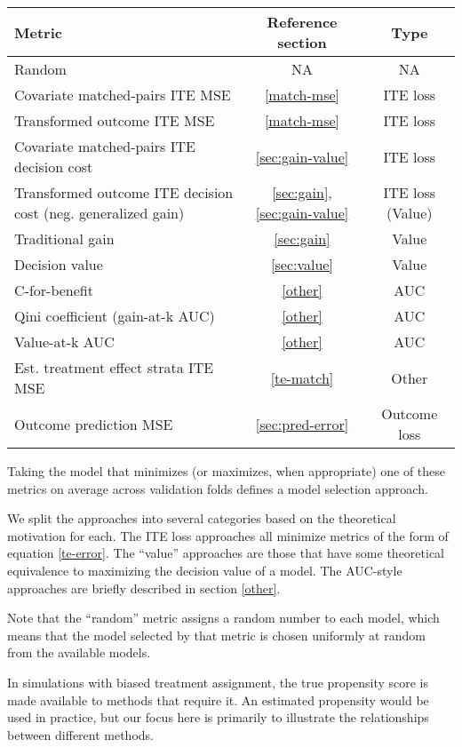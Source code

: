 \begin{center}
\begin{tabu}{|m{6cm}|c|c|}
	\hline
	 \rowfont[c]{\bfseries} Metric & Reference section & Type \\
	 \hline
	 Random & NA &  NA \\
	 \hline
	 Covariate matched-pairs ITE MSE & \ref{match-mse} & ITE loss \\
	 Transformed outcome ITE MSE & \ref{match-mse} & ITE loss \\
	 Covariate matched-pairs ITE decision cost &  \ref{sec:gain-value} & ITE loss \\
	 Transformed outcome ITE decision cost (neg. generalized gain) &  \ref{sec:gain}, \ref{sec:gain-value} & ITE loss (Value) \\
	 \hline
	 Traditional gain &  \ref{sec:gain} & Value \\ 
	 Decision value &  \ref{sec:value} & Value \\
	 \hline
	 C-for-benefit &  \ref{other} & AUC \\
	 Qini coefficient (gain-at-k AUC) &  \ref{other} & AUC \\
	 Value-at-k AUC &  \ref{other} & AUC \\
	 \hline
	 Est. treatment effect strata ITE MSE &  \ref{te-match} & Other \\
	 \hline
	 Outcome prediction MSE &  \ref{sec:pred-error} & Outcome loss \\
	 \hline
\end{tabu}
\end{center}

Taking the model that minimizes (or maximizes, when appropriate) one of these metrics on average across validation folds defines a model selection approach. 

We split the approaches into several categories based on the theoretical motivation for each. The ITE loss approaches all minimize metrics of the form of equation \ref{te-error}. The ``value'' approaches are those that have some theoretical equivalence to maximizing the decision value of a model. The AUC-style approaches are briefly described in section \ref{other}. 

Note that the ``random'' metric assigns a random number to each model, which means that the model selected by that metric is chosen uniformly at random from the available models. 

In simulations with biased treatment assignment, the true propensity score is made available to methods that require it. An estimated propensity would be used in practice, but our focus here is primarily to illustrate the relationships between different methods.

